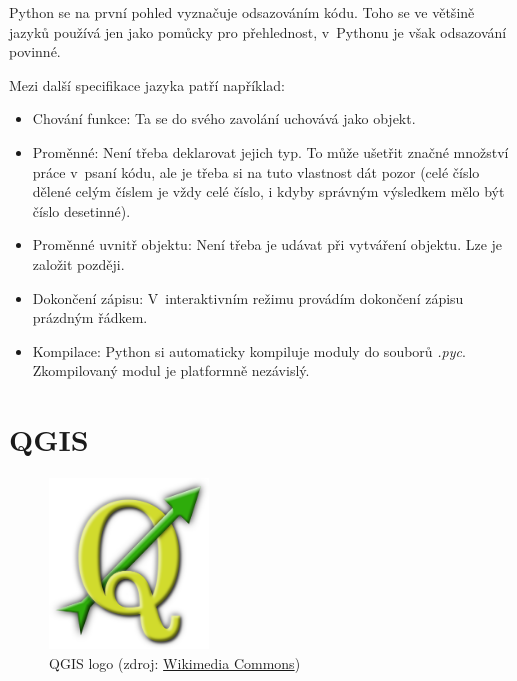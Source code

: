 Python se na první pohled vyznačuje odsazováním kódu. Toho se ve většině jazyků používá jen jako
pomůcky pro přehlednost, v~Pythonu je však odsazování povinné. 

Mezi další specifikace jazyka patří například: 
\begin{itemize}

	\item Chování funkce: Ta se do svého zavolání uchovává jako objekt. 
	
	\item Proměnné: Není třeba deklarovat jejich typ. To může ušetřit značné množství práce
	v~psaní kódu, ale je třeba si na tuto vlastnost dát pozor (celé číslo dělené celým číslem je
	vždy celé číslo, i kdyby správným výsledkem mělo být číslo desetinné). 
	
	\item Proměnné uvnitř objektu: Není třeba je udávat při vytváření objektu. Lze je založit později. 
	\item Dokončení zápisu: V~interaktivním režimu provádím dokončení zápisu prázdným řádkem. 
	\item Kompilace: Python si automaticky kompiluje moduly do souborů \textit{.pyc}. Zkompilovaný
	modul je platformně nezávislý. 

\end{itemize}


\section{QGIS}
\label{qgis}

  \begin{figure}[H]
    \centering
      \includegraphics[width=120pt]{./pictures/qgis.png}
      \caption[QGIS logo]{QGIS logo 
      (zdroj: \href{https://commons.wikimedia.org/wiki/File:QGIS\_logo.svg}{Wikimedia Commons})}
      \label{fig:qgis}
  \end{figure}

